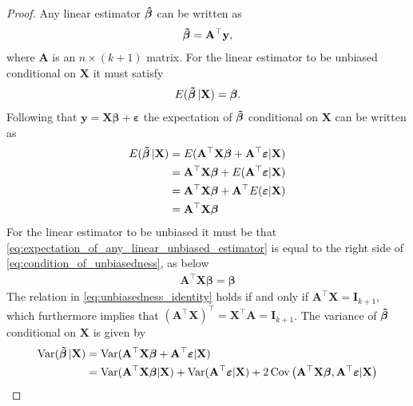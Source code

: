 \begin{proof}
    Any linear estimator $\operatorname{\boldsymbol{\hat{\beta}}}$ can be written as
    \begin{align}\label{eq:any_linear_operator}
        \boldsymbol{\Tilde{\beta}} = \mathbf{A}^\top \mathbf{y},
    \end{align}
    where $\mathbf{A}$ is an $n \times (k + 1)$ matrix.
    For the linear estimator to be unbiased conditional on $\mathbf{X}$ it must satisfy
    \begin{align}\label{eq:condition_of_unbiasedness}
        E(\operatorname{\boldsymbol{\Tilde{\beta}}}|\mathbf{X}) = \boldsymbol{\beta}.
    \end{align}
    Following that $\mathbf{y} = \mathbf{X}\boldsymbol{\beta} + \boldsymbol{\varepsilon}$ the expectation of $\operatorname{\boldsymbol{\Tilde{\beta}}}$ conditional on $\mathbf{X}$ can be written as
    \begin{align}
       E(\operatorname{\boldsymbol{\Tilde{\beta}}}|\mathbf{X}) &= E( \mathbf{A}^\top\mathbf{X}\boldsymbol{\beta} + \mathbf{A}^\top\boldsymbol{\varepsilon}|\mathbf{X} )\nonumber \\
        &=  \mathbf{A}^\top\mathbf{X}\boldsymbol{\beta} + E( \mathbf{A}^\top\boldsymbol{\varepsilon}|\mathbf{X} )\nonumber \\
        &=\mathbf{A}^\top\mathbf{X}\boldsymbol{\beta} +  \mathbf{A}^\top E( \boldsymbol{\varepsilon}|\mathbf{X} )\nonumber \\
        &=\mathbf{A}^\top\mathbf{X}\boldsymbol{\beta}\label{eq:expectation_of_any_linear_unbiased_estimator}
    \end{align}
    For the linear estimator to be unbiased it must be that \eqref{eq:expectation_of_any_linear_unbiased_estimator} is equal to the right side of \eqref{eq:condition_of_unbiasedness}, as below
    \begin{align}\label{eq:unbiasedness_identity}
        \mathbf{A}^\top\mathbf{X}\boldsymbol{\beta} = \boldsymbol{\beta}
    \end{align}
    The relation in \eqref{eq:unbiasedness_identity} holds if and only if $\mathbf{A}^\top\mathbf{X} = \mathbf{I}_{k + 1}$, which furthermore implies that $(\mathbf{A}^\top\mathbf{X})^\top = \mathbf{X}^\top\mathbf{A} = \mathbf{I}_{k + 1}$.
    The variance of $\operatorname{\boldsymbol{\Tilde{\beta}}}$ conditional on $\mathbf{X}$ is given by
    \begin{align}
        \var(\betatilde|\mathbf{X}) &= \var(\mathbf{A}^\top\mathbf{X}\boldsymbol{\beta} + \mathbf{A}^\top\boldsymbol{\varepsilon}|\mathbf{X}) \nonumber\\
        &= \var(\mathbf{A}^\top\mathbf{X}\boldsymbol{\beta}|\mathbf{X}) + \var(\mathbf{A}^\top\boldsymbol{\varepsilon}|\mathbf{X}) + 2 \cov\left(\mathbf{A}^\top\mathbf{X}\boldsymbol{\beta},\mathbf{A}^\top\boldsymbol{\varepsilon}|\mathbf{X}\right) \nonumber\\

\end{align}
\end{proof}
